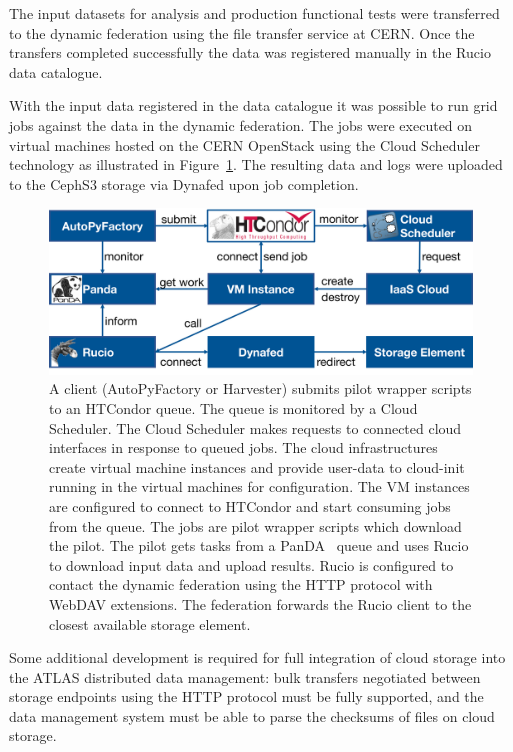 \documentclass[a4paper]{jpconf}
\begin{document}
The input datasets for analysis and production functional tests were transferred to the dynamic federation using the file transfer service at CERN. Once the transfers completed successfully the data was registered manually in the Rucio data catalogue.

With the input data registered in the data catalogue it was possible to run grid jobs against the data in the dynamic federation. The jobs were executed on virtual machines hosted on the CERN OpenStack using the Cloud Scheduler technology as illustrated in Figure~\ref{fig:atlas-cloud}. The resulting data and logs were uploaded to the CephS3 storage via Dynafed upon job completion.

\begin{figure}
  \includegraphics[width=\textwidth]{atlas-cloud-system.png}
  \caption{A client (AutoPyFactory or Harvester) submits pilot wrapper scripts to an HTCondor queue. The queue is monitored by a Cloud Scheduler. The Cloud Scheduler makes requests to connected cloud interfaces in response to queued jobs. The cloud infrastructures create virtual machine instances and provide user-data to cloud-init running in the virtual machines for configuration. The VM instances are configured to connect to HTCondor and start consuming jobs from the queue. The jobs are pilot wrapper scripts which download the pilot. The pilot gets tasks from a PanDA~\cite{panda} queue and uses Rucio to download input data and upload results. Rucio is configured to contact the dynamic federation using the HTTP protocol with WebDAV extensions. The federation forwards the Rucio client to the closest available storage element.}
  \label{fig:atlas-cloud}
\end{figure}

Some additional development is required for full integration of cloud storage into the ATLAS distributed data management: bulk transfers negotiated between storage endpoints using the HTTP protocol must be fully supported, and the data management system must be able to parse the checksums of files on cloud storage.
\end{document}
